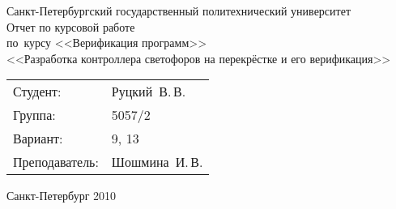 
\begin{titlepage} %

\begin{center} %

\large Санкт-Петербургский государственный политехнический университет\\[5.5cm]

\huge Отчет по курсовой работе\\[0.6cm] %
\large по~курсу <<Верификация программ>>\\[1cm]
\large <<Разработка контроллера светофоров на перекрёстке и его верификация>>\\[6cm]

\begin{flushright} %
\begin{tabular}{l l}
Студент: & Руцкий~В.\,В.\\
Группа: & 5057/2\\
Вариант: & 9, 13\\
Преподаватель: & Шошмина~И.\,В.
\end{tabular}
\end{flushright} %

\vfill %

{\large Санкт-Петербург 2010}
\end{center} %
\thispagestyle{empty} %
\end{titlepage} %
